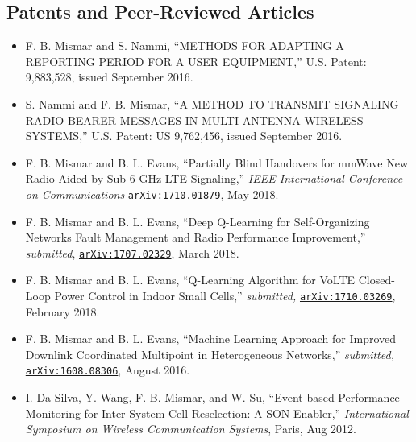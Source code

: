 \documentclass{article}
\begin{document}
\subsection*{\sc Patents and Peer-Reviewed Articles}
\begin{itemize}[leftmargin=*]
\item F. B. Mismar and S. Nammi, ``METHODS FOR ADAPTING A REPORTING PERIOD FOR A USER EQUIPMENT,'' U.S. Patent: 9,883,528, issued September 2016.
\item S. Nammi and F. B. Mismar, ``A METHOD TO TRANSMIT SIGNALING RADIO BEARER MESSAGES IN MULTI ANTENNA WIRELESS  SYSTEMS,'' U.S. Patent: US 9,762,456, issued September 2016.
\item F. B. Mismar and B. L. Evans, ``Partially Blind Handovers for mmWave New Radio Aided by Sub-6 GHz LTE Signaling,'' \textit{IEEE International Conference on Communications} \href{https://arxiv.org/pdf/1707.01879.pdf}{\nolinkurl{arXiv:1710.01879}}, May 2018.
\item F. B. Mismar and B. L. Evans, ``Deep Q-Learning for Self-Organizing Networks Fault Management and Radio Performance Improvement,'' \textit{submitted}, \href{https://arxiv.org/pdf/arXiv:1707.02329.pdf}{\nolinkurl{arXiv:1707.02329}}, March 2018.
\item F. B. Mismar and B. L. Evans, ``Q-Learning Algorithm for VoLTE Closed-Loop Power Control in Indoor Small Cells,'' \textit{submitted,} \href{https://arxiv.org/pdf/1707.03269.pdf}{\nolinkurl{arXiv:1710.03269}}, February 2018.
\item F. B. Mismar and B. L. Evans, ``Machine Learning Approach for Improved Downlink Coordinated Multipoint in Heterogeneous Networks,'' \textit{submitted,} \href{https://arxiv.org/pdf/1608.08306.pdf}{\nolinkurl{arXiv:1608.08306}}, August 2016.
\item I. Da Silva, Y. Wang, F. B. Mismar, and W. Su, ``Event-based Performance Monitoring for Inter-System Cell Reselection: A SON Enabler,'' \textit{International Symposium on Wireless Communication Systems}, Paris, Aug 2012.
\end{itemize}
\vspace*{-0.1in}
\end{document}
